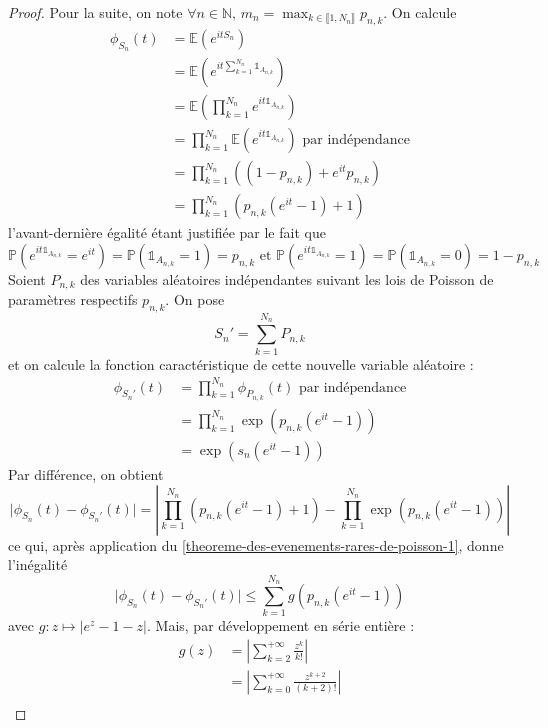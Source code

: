   \begin{proof}
    Pour la suite, on note $\forall n \in \mathbb{N}, \, m_n = \max_{k \in \llbracket 1, N_n \rrbracket} p_{n,k}$. On calcule
    \begin{align*}
      \phi_{S_n}(t) &= \mathbb{E} \left(e^{itS_n} \right) \\
      &= \mathbb{E} \left(e^{it \sum_{k=1}^{N_n} \mathbb{1}_{A_{n,k}}} \right) \\
      &= \mathbb{E} \left(\prod_{k=1}^{N_n} e^{it \mathbb{1}_{A_{n,k}}} \right) \\
      &= \prod_{k=1}^{N_n} \mathbb{E} \left(e^{it \mathbb{1}_{A_{n,k}}} \right) \text{ par indépendance} \\
      &= \prod_{k=1}^{N_n} \left( (1 - p_{n,k}) + e^{it} p_{n,k} \right) \\
      &= \prod_{k=1}^{N_n} \left( p_{n,k}(e^{it}-1) + 1 \right)
    \end{align*}
    l'avant-dernière égalité étant justifiée par le fait que
    \[ \mathbb{P}(e^{it \mathbb{1}_{A_{n,k}}} = e^{it}) = \mathbb{P}(\mathbb{1}_{A_{n,k}} = 1) = p_{n,k} \text{ et } \mathbb{P}(e^{it \mathbb{1}_{A_{n,k}}} = 1) = \mathbb{P}(\mathbb{1}_{A_{n,k}} = 0) = 1 - p_{n,k} \]
    Soient $P_{n,k}$ des variables aléatoires indépendantes suivant les lois de Poisson de paramètres respectifs $p_{n,k}$. On pose
    \[ S_n' = \sum_{k=1}^{N_n} P_{n,k} \]
    et on calcule la fonction caractéristique de cette nouvelle variable aléatoire :
    \begin{align*}
      \phi_{S_n'}(t) &= \prod_{k=1}^{N_n} \phi_{P_{n,k}} (t) \text{ par indépendance} \\
      &= \prod_{k=1}^{N_n} \exp(p_{n,k}(e^{it} - 1)) \\
      &= \exp(s_n(e^{it} - 1))
    \end{align*}
    Par différence, on obtient
    \[ \vert \phi_{S_n}(t) - \phi_{S_n'}(t) \vert = \left| \prod_{k=1}^{N_n} \left( p_{n,k}(e^{it}-1) + 1 \right) - \prod_{k=1}^{N_n} \exp(p_{n,k}(e^{it} - 1)) \right| \]
    ce qui, après application du \cref{theoreme-des-evenements-rares-de-poisson-1}, donne l'inégalité
    \[ \vert \phi_{S_n}(t) - \phi_{S_n'}(t) \vert \leq \sum_{k=1}^{N_n} g(p_{n,k}(e^{it}-1)) \]
    avec $g : z \mapsto \vert e^z - 1 - z \vert$. Mais, par développement en série entière :
    \begin{align*}
      g(z) &= \left\vert \sum_{k=2}^{+\infty} \frac{z^k}{k!} \right\vert \\
      &= \left\vert \sum_{k=0}^{+\infty} \frac{z^{k+2}}{(k+2)!} \right\vert  \\

\end{align*}
\end{proof}
